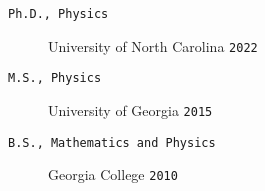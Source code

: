 \documentclass[11pt, letter]{article}
\begin{document}
\begin{description}
		\item[\tt Ph.D., Physics] University of North Carolina   \hfill {\tt 2022}
		\item[\tt M.S., Physics] University of Georgia           \hfill {\tt 2015}
		\item[\tt B.S., Mathematics and Physics] Georgia College \hfill {\tt 2010}
\end{description}
\vfill
\mbox{}
\end{document}
